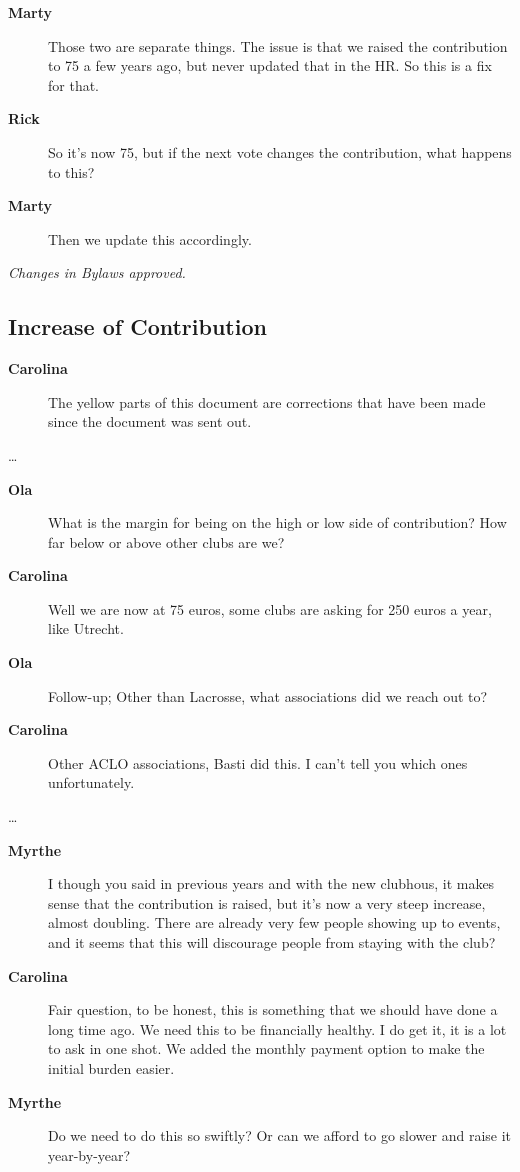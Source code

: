 \documentclass[12pt, a4paper]{article}
\newcommand{\speak}[2]{\begin{description}\item[\textbf{#1}]#2\end{description}}
\begin{document}
\speak{Marty}{Those two are separate things. The issue is that we raised the contribution to 75 a few years ago, but never updated that in the HR. So this is a fix for that.}

\speak{Rick}{So it's now 75, but if the next vote changes the contribution, what happens to this?}

\speak{Marty}{Then we update this accordingly.}


\textit{Changes in Bylaws approved.}


\subsection{Increase of Contribution}

\speak{Carolina}{The yellow parts of this document are corrections that have been made since the document was sent out.}

\dots

\speak{Ola}{What is the margin for being on the high or low side of contribution? How far below or above other clubs are we?}

\speak{Carolina}{Well we are now at 75 euros, some clubs are asking for 250 euros a year, like Utrecht.}

\speak{Ola}{Follow-up; Other than Lacrosse, what associations did we reach out to?}

\speak{Carolina}{Other ACLO associations, Basti did this. I can't tell you which ones unfortunately.}

\dots

\speak{Myrthe}{I though you said in previous years and with the new clubhous, it makes sense that the contribution is raised, but it's now a very steep increase, almost doubling. There are already very few people showing up to events, and it seems that this will discourage people from staying with the club?}

\speak{Carolina}{Fair question, to be honest, this is something that we should have done a long time ago. We need this to be financially healthy. I do get it, it is a lot to ask in one shot. We added the monthly payment option to make the initial burden easier.}


\speak{Myrthe}{Do we need to do this so swiftly? Or can we afford to go slower and raise it year-by-year?}
\end{document}
